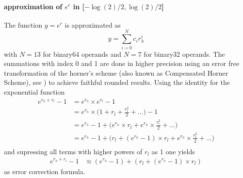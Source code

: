 \documentclass[10pt,a4paper,final,oneside]{article}
\numberwithin{equation}{subsection}
\begin{document}
\paragraph{approximation of $e^r$ in [$-\log(2)/2, \log(2)/2$]}

    The function $y = e^r$ is approximated as
    \begin{equation}
        y = \sum_{i=0}^{N}c_i r_h^i
    \end{equation}
    with $N=13$ for binary64 operands and $N=7$ for binary32 operands.
    The summations with index 0 and 1 are done in higher precision
    using an error free transformation of the horner's scheme
    (also known as Compensated Horner Scheme), see \cite{Graillat05compensatedhorner}) to achieve
    faithful rounded results.
    Using the identity for the exponential function
    \[
        \begin{aligned}
        e^{r_h+r_l} - 1 &=
            e^{r_h} \times e^{r_l} - 1 \\
                        &=
            e^{r_h} \times \big( 1+ r_l + \frac{r_l^2}{2} + \dots \big) - 1 \\
                        &=
            e^{r_h} -1 + \big( e^{r_h} \times r_l +
                                e^{r_h} \times \frac{r_l^2}{2} +
                                \dots
                         \big) \\
                        &=
            e^{r_h} -1 + \big( r_l + (e^{r_h}-1) \times r_l +
                                e^{r_h} \times \frac{r_l^2}{2} +
                                \dots
                         \big) \\
        \end{aligned}
    \]
    and supressing all terms with higher powers of $r_l$ as 1 one yields
    \begin{equation}
        \begin{aligned}
        e^{r_h+r_l} - 1 & \approx
            (e^{r_h} -1) + (r_l + (e^{r_h}-1) \times r_l)
        \end{aligned}
    \end{equation}
    as error correction formula.
\end{document}
